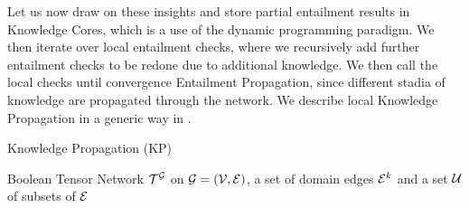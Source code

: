 

Let us now draw on these insights and store partial entailment results in Knowledge Cores, which is a use of the dynamic programming paradigm.
We then iterate over local entailment checks, where we recursively add further entailment checks to be redone due to additional knowledge.
We then call the local checks until convergence Entailment Propagation, since different stadia of knowledge are propagated through the network.
We describe local Knowledge Propagation in a generic way in .


\begin{algorithm}[hbt!]
    \caption{Knowledge Propagation (KP)}\label{alg:knowledgePropagation}
    \begin{algorithmic}
        \State Boolean Tensor Network $\mathcal{T}^{\mathcal{G}}$ on $\mathcal{G}=(\mathcal{V},\mathcal{E})$,
        a set of domain edges $\mathcal{E}^{k}$
        and a set $\mathcal{U}$ of subsets of $\mathcal{E}$


\end{algorithmic}
\end{algorithm}
